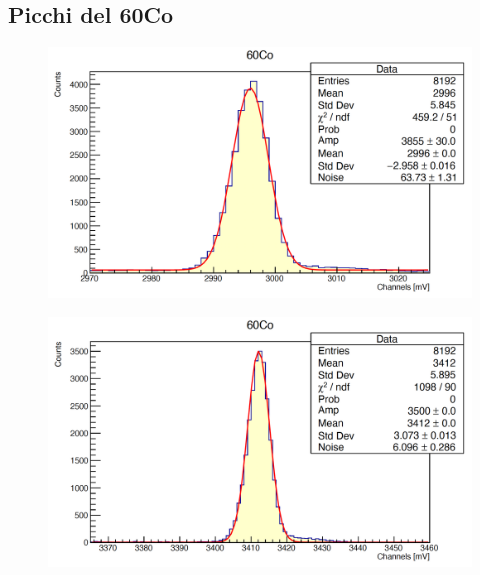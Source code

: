 \documentclass[a4paper,10pt]{article}
\begin{document}
\subsection{Picchi del 60Co}
\begin{figure}[H]
    \centering
    \includegraphics[scale=0.45]{appendice/Co}
\end{figure}
\begin{figure}[H]
    \centering
    \includegraphics[scale=0.45]{appendice/Co2}
\end{figure}

\end{document}
